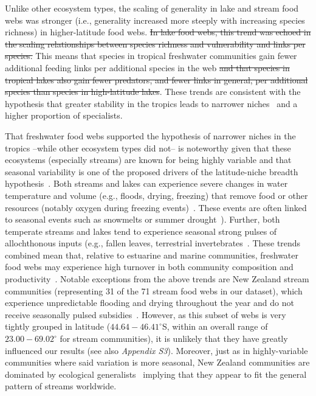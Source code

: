\documentclass[12pt]{article}
\begin{document}
  Unlike other ecosystem types, the scaling of generality in lake and stream
  food webs was stronger (i.e., generality increased more steeply with
  increasing species richness) in higher-latitude food webs. \st{In lake food webs,
  this trend was echoed in the scaling relationships between species richness
  and vulnerability and links per species.} This means that species in tropical
  freshwater communities gain fewer additional feeding links per additional
  species in the web\st{ and that species in tropical lakes also gain fewer
  predators, and fewer links in general, per additional species than species
  in high-latitude lakes}. These trends are consistent with the hypothesis that
  greater stability in the tropics leads to narrower niches~\cite{Vazquez2004}
  and a higher proportion of specialists. 


  That freshwater food webs supported the hypothesis of narrower niches in the
  tropics --while other ecosystem types did not-- is noteworthy given that
  these ecosystems (especially streams) are known for being highly variable
  and that seasonal variability is one of the proposed drivers of the
  latitude-niche breadth hypothesis~\cite{Vazquez2004}. Both streams and lakes
  can experience severe changes in water temperature and volume (e.g., floods,
  drying, freezing) that remove food or other resources (notably oxygen during
  freezing events)~\cite{Winterbourn1997,Meding2001}. These events are often
  linked to seasonal events such as snowmelts or summer
  drought~\cite{Winterbourn1997}). Further, both temperate streams and lakes
  tend to experience seasonal strong pulses of allochthonous inputs (e.g.,
  fallen leaves, terrestrial
  invertebrates~\cite{Nakano2001,Lennon2004,Zeng2008}. These trends combined
  mean that, relative to estuarine and marine communities, freshwater food 
  webs may experience high turnover in both community composition and 
  productivity~\cite{Tilzer1988,Magalhaes1993,Baird1989}. Notable exceptions from the above
  trends are New Zealand stream communities (representing 31 of the 71 stream
  food webs in our dataset), which experience unpredictable flooding and
  drying throughout the year and do not receive seasonally pulsed
  subsidies~\cite{Winterbourn1997,Winterbourn1981}. However, as this subset of
  webs is very tightly grouped in latitude ($44.64-46.41^{\circ}$S, within an
  overall range of $23.00-69.02^{\circ}$ for stream communities), it is unlikely that they have greatly
  influenced our results (see also \emph{Appendix S3}). Moreover, just as in
  highly-variable communities where said variation is more seasonal, New
  Zealand communities are dominated by ecological
  generalists~\cite{Winterbourn1997,Winterbourn1981} implying that they appear
  to fit the general pattern of streams worldwide.
\end{document}
